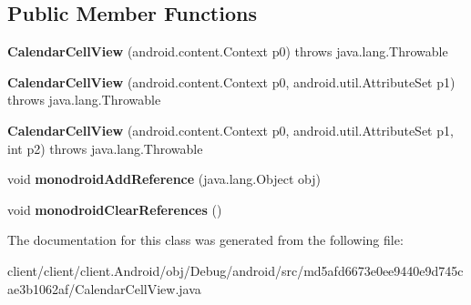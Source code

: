\subsection*{Public Member Functions}
\begin{DoxyCompactItemize}
\item 
\hypertarget{classmd5afd6673e0ee9440e9d745cae3b1062af_1_1CalendarCellView_a37ba7b38ff03f0e64f9fcd49edf31dd4}{}{\bfseries Calendar\+Cell\+View} (android.\+content.\+Context p0)  throws java.\+lang.\+Throwable 	\label{classmd5afd6673e0ee9440e9d745cae3b1062af_1_1CalendarCellView_a37ba7b38ff03f0e64f9fcd49edf31dd4}

\item 
\hypertarget{classmd5afd6673e0ee9440e9d745cae3b1062af_1_1CalendarCellView_a9aa2b62735eccd971277c757794bb172}{}{\bfseries Calendar\+Cell\+View} (android.\+content.\+Context p0, android.\+util.\+Attribute\+Set p1)  throws java.\+lang.\+Throwable 	\label{classmd5afd6673e0ee9440e9d745cae3b1062af_1_1CalendarCellView_a9aa2b62735eccd971277c757794bb172}

\item 
\hypertarget{classmd5afd6673e0ee9440e9d745cae3b1062af_1_1CalendarCellView_ae4ba7c096bd826b73391f1c883e3bee8}{}{\bfseries Calendar\+Cell\+View} (android.\+content.\+Context p0, android.\+util.\+Attribute\+Set p1, int p2)  throws java.\+lang.\+Throwable 	\label{classmd5afd6673e0ee9440e9d745cae3b1062af_1_1CalendarCellView_ae4ba7c096bd826b73391f1c883e3bee8}

\item 
\hypertarget{classmd5afd6673e0ee9440e9d745cae3b1062af_1_1CalendarCellView_a8664c136bbf60229e7cfd71cf5fcb1ef}{}void {\bfseries monodroid\+Add\+Reference} (java.\+lang.\+Object obj)\label{classmd5afd6673e0ee9440e9d745cae3b1062af_1_1CalendarCellView_a8664c136bbf60229e7cfd71cf5fcb1ef}

\item 
\hypertarget{classmd5afd6673e0ee9440e9d745cae3b1062af_1_1CalendarCellView_a9f9fb82abba6fe800998fcfc681374d4}{}void {\bfseries monodroid\+Clear\+References} ()\label{classmd5afd6673e0ee9440e9d745cae3b1062af_1_1CalendarCellView_a9f9fb82abba6fe800998fcfc681374d4}

\end{DoxyCompactItemize}


The documentation for this class was generated from the following file\+:\begin{DoxyCompactItemize}
\item 
client/client/client.\+Android/obj/\+Debug/android/src/md5afd6673e0ee9440e9d745cae3b1062af/Calendar\+Cell\+View.\+java\end{DoxyCompactItemize}
